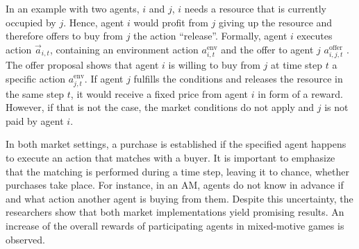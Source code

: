 In an example with two agents, $i$ and $j$, $i$ needs a resource that is currently occupied by $j$. Hence, agent $i$ would profit from $j$ giving up the resource and therefore offers to buy from $j$ the action ``release''. Formally, agent $i$ executes action $\overrightarrow{a}_{i,t}$, containing an environment action $a^{\text{env}}_{i,t}$ and the offer to agent $j$ $a^{\text{offer}}_{i,j,t}$ \cite{scbe21}. The offer proposal shows that agent $i$ is willing to buy from $j$ at time step $t$ a specific action $a^{\text{env}}_{j,t}$. If agent $j$ fulfills the conditions and releases the resource in the same step $t$, it would receive a fixed price from agent $i$ in form of a reward. However, if that is not the case, the market conditions do not apply and $j$ is not paid by agent $i$.

In both market settings, a purchase is established if the specified agent happens to execute an action that matches with a buyer. It is important to emphasize that the matching is performed during a time step, leaving it to chance, whether purchases take place. For instance, in an AM, agents do not know in advance if and what action another agent is buying from them. Despite this uncertainty, the researchers show that both market implementations yield promising results. An increase of the overall rewards of participating agents in mixed-motive games is observed.